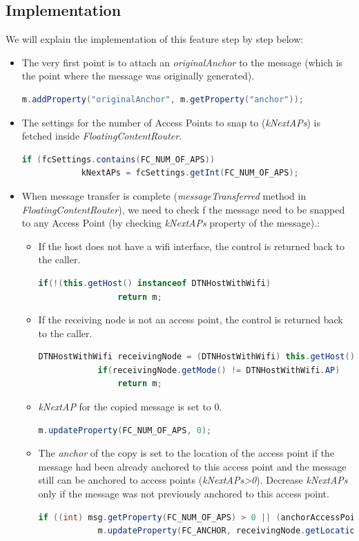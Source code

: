 \subsection{Implementation}
We will explain the implementation of this feature step by step below:
\begin{itemize}
	\item The very first point is to attach an \textit{originalAnchor} to the message (which is the point where the message was originally generated).
	\begin{lstlisting}[language=java]
	m.addProperty("originalAnchor", m.getProperty("anchor"));
	\end{lstlisting}
	\item The settings for the number of Access Points to snap to (\textit{kNextAPs}) is fetched inside \textit{FloatingContentRouter}.
	\begin{lstlisting}[language=java]
		if (fcSettings.contains(FC_NUM_OF_APS))
			kNextAPs = fcSettings.getInt(FC_NUM_OF_APS);
	\end{lstlisting}
	\item When message transfer is complete (\textit{messageTransferred} method in \textit{FloatingContentRouter}), we need to check f the message need to be snapped to any Access Point (by checking \textit{kNextAPs} property of the message).:
	\begin{itemize}
		\item If the host does not have a wifi interface, the control is returned back to the caller.
		\begin{lstlisting}[language=java]
			if(!(this.getHost() instanceof DTNHostWithWifi)
				return m;
			\end{lstlisting}
		\item If the receiving node is not an access point, the control is returned back to the caller.
		\begin{lstlisting}[language=java]
			DTNHostWithWifi receivingNode = (DTNHostWithWifi) this.getHost();
			if(receivingNode.getMode() != DTNHostWithWifi.AP)
				return m;
		\end{lstlisting}

		\item \textit{kNextAP} for the copied message is set to 0.
		\begin{lstlisting}[language=java]
			m.updateProperty(FC_NUM_OF_APS, 0);
		\end{lstlisting}

		\item The \textit{anchor} of the copy is set to the location of the access point if the message had been already anchored to this access point and the message still can be anchored to access points (\textit{kNextAPs>0}). Decrease \textit{kNextAPs} only if the message was not previously anchored to this access point.
		\begin{lstlisting}[language=java]
		if ((int) msg.getProperty(FC_NUM_OF_APS) > 0 || (anchorAccessPoints != null && anchorAccessPoints.contains(receivingNode.toString()))) {
			m.updateProperty(FC_ANCHOR, receivingNode.getLocation().clone());


\end{lstlisting}
\end{itemize}
\end{itemize}
